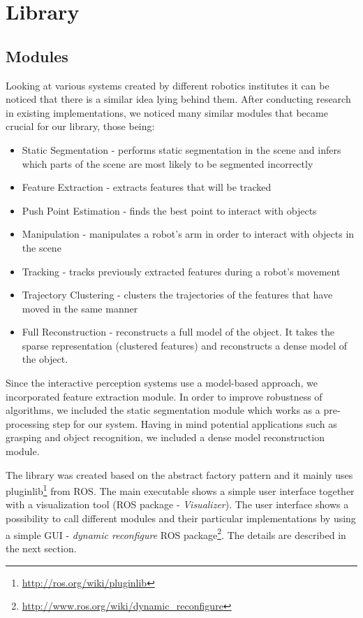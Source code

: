 \section{Library}
\subsection{Modules}
Looking at various systems created by different robotics institutes  it can be noticed that there is a similar idea lying behind them. After conducting research in existing implementations, we noticed many similar modules that became crucial for our library, those being:

\begin{itemize}
\item Static Segmentation - performs static segmentation in the scene and infers which parts of the scene are most likely to be segmented incorrectly
\item Feature Extraction - extracts features that will be tracked
\item Push Point Estimation - finds the best point to interact with objects
\item Manipulation - manipulates a robot's arm in order to interact with objects in the scene
\item Tracking - tracks previously extracted features during a robot's movement
\item Trajectory Clustering - clusters the trajectories of the features that have moved in the same manner
\item Full Reconstruction - reconstructs a full model of the object. It takes the sparse representation (clustered features) and reconstructs a dense model of the object.
\end{itemize}

Since the interactive perception systems use a model-based approach, we incorporated feature extraction module. In order to improve robustness of algorithms, we included the static segmentation module which works as a pre-processing step for our system. Having in mind potential applications such as grasping and object recognition, we included a dense model reconstruction module.

The library was created based on the abstract factory pattern and it mainly uses pluginlib\footnote{\url{http://ros.org/wiki/pluginlib}} from ROS. The main executable shows a simple user interface together with a visualization tool (ROS package - \textit{Visualizer}). The user interface shows a possibility to call different modules and their particular implementations by using a simple GUI - \textit{dynamic reconfigure} ROS package\footnote{\url{http://www.ros.org/wiki/dynamic_reconfigure}}. The details are described in the next section.

